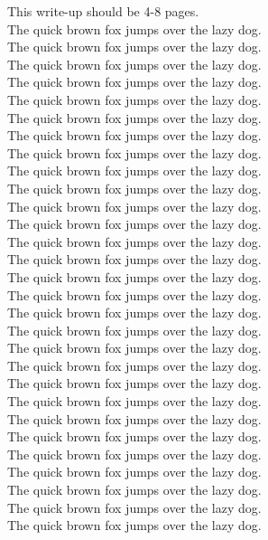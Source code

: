 \vspace{1cm}
This write-up should be 4-8 pages. \\
The quick brown fox jumps over the lazy dog.\\
The quick brown fox jumps over the lazy dog.\\
The quick brown fox jumps over the lazy dog.\\
The quick brown fox jumps over the lazy dog.\\
The quick brown fox jumps over the lazy dog.\\
The quick brown fox jumps over the lazy dog.\\
The quick brown fox jumps over the lazy dog.\\
The quick brown fox jumps over the lazy dog.\\
The quick brown fox jumps over the lazy dog.\\
The quick brown fox jumps over the lazy dog.\\
The quick brown fox jumps over the lazy dog.\\
The quick brown fox jumps over the lazy dog.\\
The quick brown fox jumps over the lazy dog.\\
The quick brown fox jumps over the lazy dog.\\
The quick brown fox jumps over the lazy dog.\\
The quick brown fox jumps over the lazy dog.\\
The quick brown fox jumps over the lazy dog.\\
The quick brown fox jumps over the lazy dog.\\
The quick brown fox jumps over the lazy dog.\\
The quick brown fox jumps over the lazy dog.\\
The quick brown fox jumps over the lazy dog.\\
The quick brown fox jumps over the lazy dog.\\
The quick brown fox jumps over the lazy dog.\\
The quick brown fox jumps over the lazy dog.\\
The quick brown fox jumps over the lazy dog.\\
The quick brown fox jumps over the lazy dog.\\
The quick brown fox jumps over the lazy dog.\\
The quick brown fox jumps over the lazy dog.\\
The quick brown fox jumps over the lazy dog.\\
